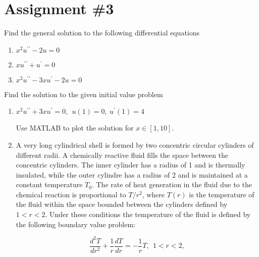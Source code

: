 \chapter{Assignment \#3}
\label{ch:ass3}
\begin{fullwidth}
Find the general solution to the following differential equations
\begin{enumerate}
\item $x^2 u^{\prime \prime} - 2u = 0$

\vspace{1.0cm}

\item $xu^{\prime \prime} + u^{\prime} = 0$

\vspace{1.0cm}

\item $x^2 u^{\prime \prime} - 3xu^{\prime}-2u =0$

\vspace{1.0cm}

\end{enumerate}

Find the solution to the given initial value problem

\begin{enumerate}[resume]
\item $x^2u^{\prime \prime}+3xu^{\prime} = 0, \ \ u(1) = 0, \ u^{\prime}(1)=4$

Use MATLAB to plot the solution for $x\in[1,10]$.

\vspace{1.0cm}

\item A very long cylindrical shell is formed by two concentric circular cylinders of different radii.  A chemically reactive fluid fills the space between the concentric cylinders.  The inner cylinder has a radius of 1 and is thermally insulated, while the outer cylindre has a radius of 2 and is maintained at a constant temperature $T_0$.  The rate of heat generation in the fluid due to the chemical reaction is proportional to $T/r^2$, where $T(r)$ is the temperature of the fluid within the space bounded between the cylinders defined by $1<r<2$.  Under these conditions the temperature of the fluid is defined by the following boundary value problem:

\begin{equation*}
\frac{d^2T}{dr^2}+\frac{1}{r}\frac{dT}{dr}=-\frac{1}{r}T, \ \ 1 < r < 2, 
\end{equation*}


\end{enumerate}
\end{fullwidth}
